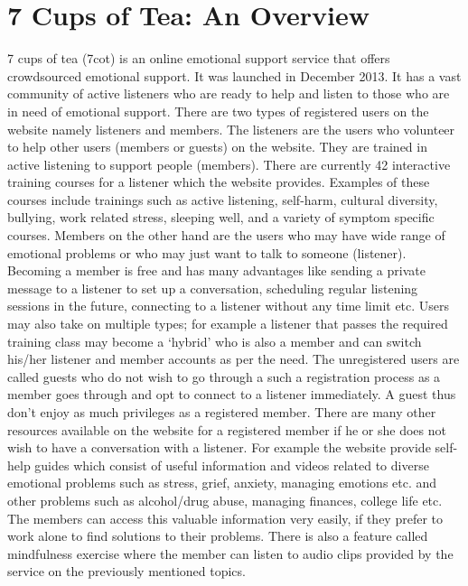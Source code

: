 \chapter{7 Cups of Tea: An Overview}

7 cups of tea (7cot) is an online emotional support service that offers crowdsourced emotional support. It was launched in December 2013. It has a vast community of active listeners who are ready to help and listen to those who are in need of emotional support. There are two types of registered users on the website namely listeners and members. The listeners are the users who volunteer to help other users (members or guests) on the website. They are trained in active listening to support people (members).  There are currently 42 interactive training courses for a listener which the website provides. Examples of these courses include trainings such as active listening, self-harm, cultural diversity, bullying, work related stress, sleeping well, and a variety of symptom specific courses. Members on the other hand are the users who may have wide range of emotional problems or who may just want to talk to someone (listener). Becoming a member is free and has many advantages like sending a private message to a listener to set up a conversation, scheduling regular listening sessions in the future, connecting to a listener without any time limit etc. Users may also take on multiple types; for example a listener that passes the required training class may become a ‘hybrid’ who is also a member and can switch his/her listener and member accounts as per the need. The unregistered users are called guests who do not wish to go through a such a registration process as a member goes through and opt to connect to a listener immediately. A guest thus don't enjoy as much privileges as a registered member. There are many other resources available on the website for a registered member if he or she does not wish to have a conversation with a listener. For example the website provide self-help guides which consist of useful information and videos related to diverse emotional problems such as stress, grief, anxiety, managing emotions etc. and other problems such as alcohol/drug abuse, managing finances, college life etc. The members can access this valuable information very easily, if they prefer to work alone to find solutions to their problems. There is also a feature called mindfulness exercise where the member can listen to audio clips provided by the service on the previously mentioned topics. 

